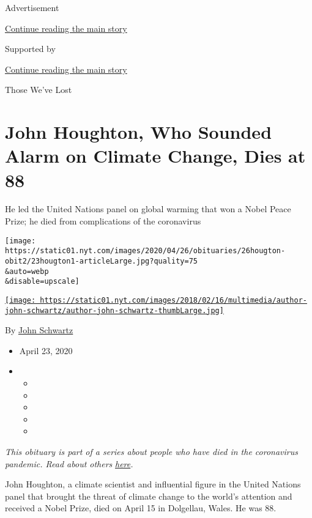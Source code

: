 Advertisement

\protect\hyperlink{after-top}{Continue reading the main story}

Supported by

\protect\hyperlink{after-sponsor}{Continue reading the main story}

Those We've Lost

\hypertarget{john-houghton-who-sounded-alarm-on-climate-change-dies-at-88}{%
\section{John Houghton, Who Sounded Alarm on Climate Change, Dies at
88}\label{john-houghton-who-sounded-alarm-on-climate-change-dies-at-88}}

He led the United Nations panel on global warming that won a Nobel Peace
Prize; he died from complications of the coronavirus

\texttt{[image: https://static01.nyt.com/images/2020/04/26/obituaries/26hougton-obit2/23hougton1-articleLarge.jpg?quality=75\\\&auto=webp\\\&disable=upscale]}

\href{https://www.nytimes.com/by/john-schwartz}{\texttt{[image: https://static01.nyt.com/images/2018/02/16/multimedia/author-john-schwartz/author-john-schwartz-thumbLarge.jpg]}}

By \href{https://www.nytimes.com/by/john-schwartz}{John Schwartz}

\begin{itemize}
\item
  April 23, 2020
\item
  \begin{itemize}
  \item
  \item
  \item
  \item
  \item
  \end{itemize}
\end{itemize}

\emph{This obituary is part of a series about people who have died in
the coronavirus pandemic. Read about others}
\href{https://www.nytimes.com/series/people-who-have-died-of-the-coronavirus}{\emph{here}}\emph{.}

John Houghton, a climate scientist and influential figure in the United
Nations panel that brought the threat of climate change to the world's
attention and received a Nobel Prize, died on April 15 in Dolgellau,
Wales. He was 88.

